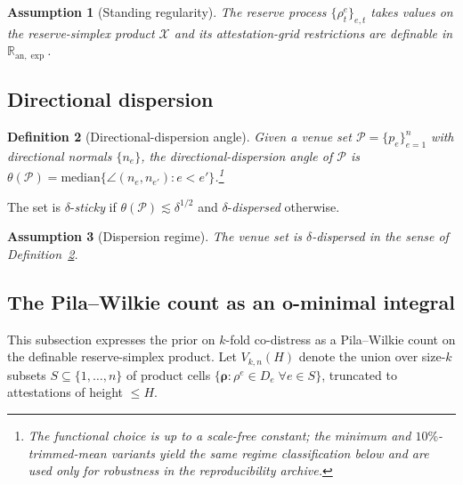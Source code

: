 \documentclass[12pt]{article}
\theoremstyle{sampledef}
\newtheorem{definition}{Definition}
\newtheorem{assumption}[definition]{Assumption}
\theoremstyle{sampleplain}
\theoremstyle{sampleremark}
\newcommand{\R}{\mathbb{R}}
\newcommand{\1}{\mathbf{1}}
\begin{document}
\begin{assumption}[Standing regularity]\label{ass:regularity}
The reserve process $\{\rho_t^e\}_{e,t}$ takes values on the
reserve-simplex product $\mathcal{X}$ and its
attestation-grid restrictions are definable in
$\R_{\mathrm{an},\exp}$.
\end{assumption}

\subsection{Directional dispersion}\label{sec:dispersion}

\begin{definition}[Directional-dispersion angle]\label{def:disp-angle}
Given a venue set $\mathcal{P} = \{p_e\}_{e=1}^{n}$ with directional
normals $\{n_e\}$, the \emph{directional-dispersion angle} of
$\mathcal{P}$ is
$\theta(\mathcal{P}) = \mathrm{median}\{\angle(n_e, n_{e'})
: e < e'\}$.\footnote{The functional choice is up to a scale-free
constant; the minimum and $10\%$-trimmed-mean variants yield the
same regime classification below and are used only for robustness
in the reproducibility archive.}
\end{definition}

The set is $\delta$-\emph{sticky} if
$\theta(\mathcal{P}) \lesssim \delta^{1/2}$ and
$\delta$-\emph{dispersed} otherwise.

\begin{assumption}[Dispersion regime]\label{ass:dispersion}
The venue set is $\delta$-dispersed in the sense of
Definition~\ref{def:disp-angle}.
\end{assumption}

\subsection{The Pila--Wilkie count as an o-minimal integral}
\label{sec:common-factor}

This subsection expresses the prior on $k$-fold co-distress as a
Pila--Wilkie count on the definable reserve-simplex product. Let
$V_{k,n}(H)$ denote the union over size-$k$ subsets
$S \subseteq \{1,\dots,n\}$ of product cells
$\{\boldsymbol{\rho} : \rho^e \in D_e \; \forall e \in S\}$,
truncated to attestations of height $\le H$.
\end{document}

